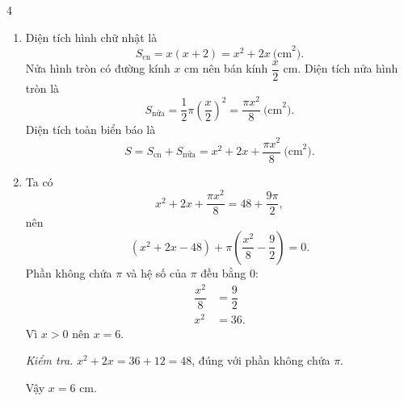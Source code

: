 \begin{Solbook}{4}
 \par \noindent  \begin {enumerate} \item Diện tích hình chữ nhật là \[ S_{\text {cn}}=x(x+2)=x^2+2x\ \text {(cm}^2\text {)}. \] Nửa hình tròn có đường kính $x$ cm nên bán kính $\dfrac {x}{2}$ cm. Diện tích nửa hình tròn là \[ S_{\text {nửa}}=\dfrac {1}{2}\pi \left (\dfrac {x}{2}\right )^2=\dfrac {\pi x^2}{8}\ \text {(cm}^2\text {)}. \] Diện tích toàn biển báo là \[ S=S_{\text {cn}}+S_{\text {nửa}}=x^2+2x+\dfrac {\pi x^2}{8}\ \text {(cm}^2\text {)}. \] \par \item Ta có \[ x^2+2x+\dfrac {\pi x^2}{8}=48+\dfrac {9\pi }{2}, \] nên \[ \left (x^2+2x-48\right )+\pi \left (\dfrac {x^2}{8}-\dfrac {9}{2}\right )=0. \] Phần không chứa $\pi $ và hệ số của $\pi $ đều bằng $0$: \begin {align*} \dfrac {x^2}{8}&=\dfrac {9}{2}\\ x^2&=36. \end {align*} Vì $x>0$ nên $x=6$. \par \emph {Kiểm tra.} $x^2+2x=36+12=48$, đúng với phần không chứa $\pi $. \par Vậy $x=6$ cm. \end {enumerate}  \hfill \qedEX 
\end{Solbook}

